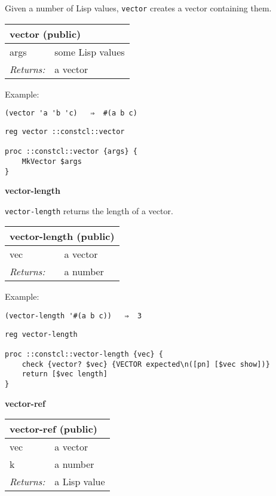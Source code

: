 \documentclass{report}
\begin{document}
Given a number of Lisp values, \texttt{vector} creates a vector containing them.

\begin{tabular}{ |l l| }
\hline
\multicolumn{2}{|l|}{vector (public)} \\
\hline
args & some Lisp values \\
\textit{Returns:} & a vector \\
\hline
\end{tabular}


Example:

\noindent\makebox[\linewidth]{\rule{\linewidth}{0.4pt}}
\begin{lstlisting}
(vector 'a 'b 'c)   ⇒  #(a b c)
\end{lstlisting}
\noindent\makebox[\linewidth]{\rule{\linewidth}{0.4pt}}
\noindent\makebox[\linewidth]{\rule{\linewidth}{0.4pt}}
\begin{lstlisting}
reg vector ::constcl::vector
 
proc ::constcl::vector {args} {
    MkVector $args
}
\end{lstlisting}
\noindent\makebox[\linewidth]{\rule{\linewidth}{0.4pt}}

\textbf{vector-length}


\texttt{vector-length} returns the length of a vector.

\begin{tabular}{ |l l| }
\hline
\multicolumn{2}{|l|}{vector-length (public)} \\
\hline
vec & a vector \\
\textit{Returns:} & a number \\
\hline
\end{tabular}


Example:

\noindent\makebox[\linewidth]{\rule{\linewidth}{0.4pt}}
\begin{lstlisting}
(vector-length '#(a b c))   ⇒  3
\end{lstlisting}
\noindent\makebox[\linewidth]{\rule{\linewidth}{0.4pt}}
\noindent\makebox[\linewidth]{\rule{\linewidth}{0.4pt}}
\begin{lstlisting}
reg vector-length
 
proc ::constcl::vector-length {vec} {
    check {vector? $vec} {VECTOR expected\n([pn] [$vec show])}
    return [$vec length]
}
\end{lstlisting}
\noindent\makebox[\linewidth]{\rule{\linewidth}{0.4pt}}

\textbf{vector-ref}

\begin{tabular}{ |l l| }
\hline
\multicolumn{2}{|l|}{vector-ref (public)} \\
\hline
vec & a vector \\
k & a number \\
\textit{Returns:} & a Lisp value \\
\hline
\end{tabular}
\end{document}
